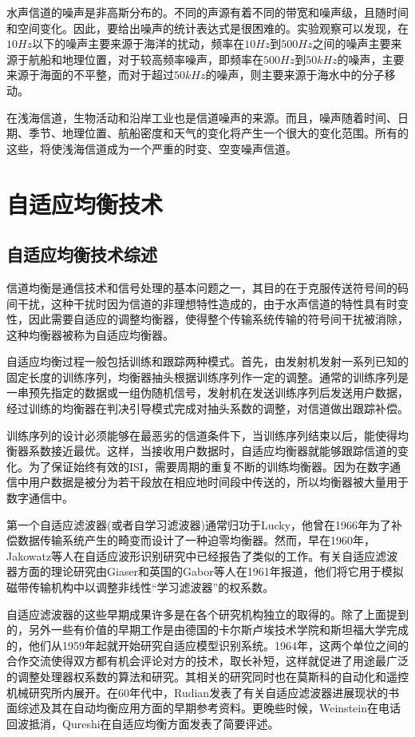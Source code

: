 水声信道的噪声是非高斯分布的。不同的声源有着不同的带宽和噪声级，且随时间和空间变化。因此，要给出噪声的统计表达式是很困难的。实验观察可以发现，在$10Hz$以下的噪声主要来源于海洋的扰动，频率在$10Hz$到$500Hz$之间的噪声主要来源于航船和地理位置，对于较高频率噪声，即频率在$500Hz$到$50kHz$的噪声，主要来源于海面的不平整，而对于超过$50kHz$的噪声，则主要来源于海水中的分子移动。

在浅海信道，生物活动和沿岸工业也是信道噪声的来源。而且，噪声随着时间、日期、季节、地理位置、航船密度和天气的变化将产生一个很大的变化范围。所有的这些，将使浅海信道成为一个严重的时变、空变噪声信道。
\section{自适应均衡技术}
\subsection{自适应均衡技术综述}
信道均衡是通信技术和信号处理的基本问题之一，其目的在于克服传送符号间的码间干扰，这种干扰时因为信道的非理想特性造成的，由于水声信道的特性具有时变性，因此需要自适应的调整均衡器，使得整个传输系统传输的符号间干扰被消除，这种均衡器被称为自适应均衡器。

自适应均衡过程一般包括训练和跟踪两种模式。首先，由发射机发射一系列已知的固定长度的训练序列，均衡器抽头根据训练序列作一定的调整。通常的训练序列是一串预先指定的数据或一组伪随机信号，发射机在发送训练序列后发送用户数据，经过训练的均衡器在判决引导模式完成对抽头系数的调整，对信道做出跟踪补偿。

训练序列的设计必须能够在最恶劣的信道条件下，当训练序列结束以后，能使得均衡器系数接近最优。这样，当接收用户数据时，自适应均衡器就能够跟踪信道的变化。为了保证始终有效的ISI，需要周期的重复不断的训练均衡器。因为在数字通信中用户数据是被分为若干段放在相应地时间段中传送的，所以均衡器被大量用于数字通信中。

第一个自适应滤波器(或者自学习滤波器)通常归功于Lucky，他曾在1966年为了补偿数据传输系统产生的畸变而设计了一种迫零均衡器。然而，早在1960年，Jakowatz等人在自适应波形识别研究中已经报告了类似的工作。有关自适应滤波器方面的理论研究由Giaser和英国的Gabor等人在1961年报道，他们将它用于模拟磁带传输机构中以调整非线性“学习滤波器”的权系数。

自适应滤波器的这些早期成果许多是在各个研究机构独立的取得的。除了上面提到的，另外一些有价值的早期工作是由德国的卡尔斯卢埃技术学院和斯坦福大学完成的，他们从1959年起就开始研究自适应模型识别系统。1964年，这两个单位之间的合作交流使得双方都有机会评论对方的技术，取长补短，这样就促进了用途最广泛的调整处理器权系数的算法和研究。其相关的研究同时也在莫斯科的自动化和遥控机械研究所内展开。在60年代中，Rudian发表了有关自适应滤波器进展现状的书面综述及其在自动均衡应用方面的早期参考资料。更晚些时候，Weinstein在电话回波抵消，Qureshi在自适应均衡方面发表了简要评述。

